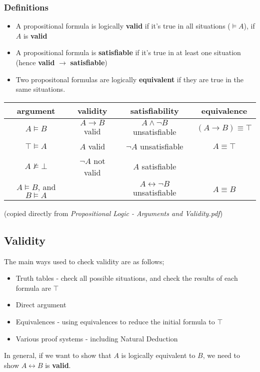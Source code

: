 \documentclass[a4paper, 12pt]{article}
\begin{document}
        \subsubsection*{Definitions}
        \begin{itemize}
            \item A propositional formula is logically \textbf{valid} if it's true in all situations ($\vDash A$), if $A$ is \textbf{valid}
            \item A propositional formula is \textbf{satisfiable} if it's true in at least one situation (hence \textbf{valid} $\rightarrow$ \textbf{satisfiable})
            \item Two propositonal formulas are logically \textbf{equivalent} if they are true in the same situations.
        \end{itemize}
        \begin{center}
            \begin{tabular}{|c|c|c|c|}
                \hline
                argument & validity & satisfiability & equivalence \\
                \hline
                $A \vDash B$ & $A \rightarrow B$ valid & $A \land \neg B$ unsatisfiable & $(A \rightarrow B) \equiv \top$ \\
                $\top \vDash A$ & $A$ valid & $\neg A$ unsatisfiable & $A \equiv \top$ \\
                $A \nvDash \bot$ & $\neg A$ not valid & $A$ satisfiable & \\
                $A \vDash B$, and $B \vDash A$ & & $A \leftrightarrow \neg B$ unsatisfiable & $A \equiv B$ \\
                \hline
            \end{tabular}
            \medskip

            (copied directly from \textit{Propositional Logic - Arguments and Validity.pdf})
        \end{center}
        \subsection*{Validity}
        The main ways used to check validity are as follows;
        \begin{itemize}
            \item Truth tables - check all possible situations, and check the results of each formula are $\top$
            \item Direct argument
            \item Equivalences - using equivalences to reduce the initial formula to $\top$
            \item Various proof systems - including Natural Deduction
        \end{itemize}
        In general, if we want to show that $A$ is logically equivalent to $B$, we need to show $A \leftrightarrow B$ is \textbf{valid}.
\end{document}
